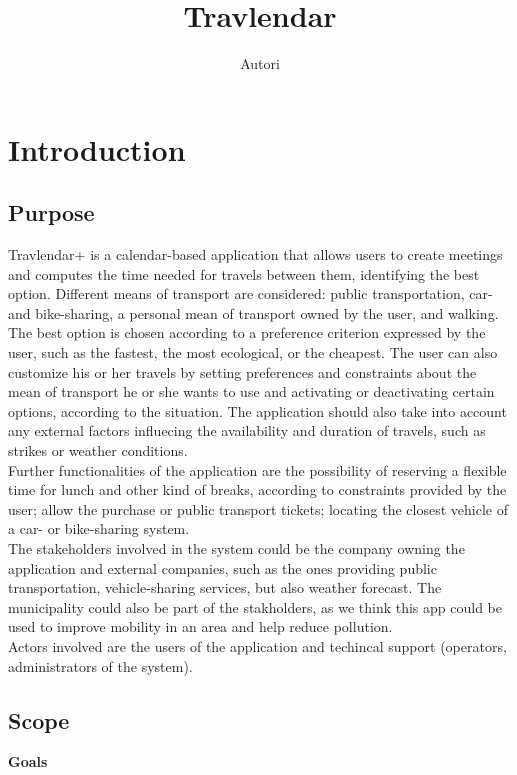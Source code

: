\documentclass[12pt, a4paper]{article}
\title{\textbf{Travlendar}}
\author{Autori}
\begin{document}
\maketitle
\newpage

\tableofcontents
\newpage

\section {Introduction}

\subsection{Purpose}
Travlendar+ is a calendar-based application that allows users to create meetings and computes the time needed for travels between them, identifying the best option. Different means of transport are considered: public transportation, car- and bike-sharing, a personal mean of transport owned by the user, and walking.\\
The best option is chosen according to a preference criterion expressed by the user, such as the fastest, the most ecological, or the cheapest. The user can also customize his or her travels by setting preferences and constraints about the mean of transport he or she wants to use and activating or deactivating certain options, according to the situation. The application should also take into account any external factors influecing the availability and duration of travels, such as strikes or weather conditions.\\
Further functionalities of the application are the possibility of reserving a flexible time for lunch and other kind of breaks, according to constraints provided by the user; allow the purchase or public transport tickets; locating the closest vehicle of a car- or bike-sharing system.\\
The stakeholders involved in the system could be the company owning the application and external companies, such as the ones providing public transportation, vehicle-sharing services, but also weather forecast. The municipality could also be part of the stakholders, as we think this app could be used to improve mobility in an area and help reduce pollution.\\
Actors involved are the users of the application and techincal support (operators, administrators of the system).

\subsection{Scope}
\textbf{Goals}
\end{document}
